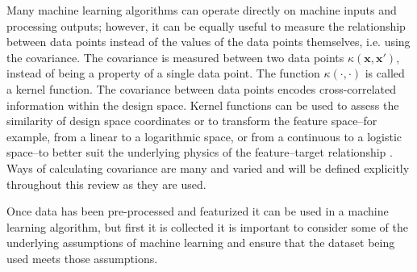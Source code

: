 Many machine learning algorithms can operate directly on machine inputs and processing outputs; however, it can be equally useful to measure the relationship between data points instead of the values of the data points themselves, i.e. using the covariance. The covariance is measured between two data points $\kappa (\mathbf{x},\mathbf{x}')$, instead of being a property of a single data point. The function $\kappa(\cdot,\cdot)$ is called a kernel function. The covariance between data points encodes cross-correlated information within the design space. Kernel functions can be used to assess the similarity of design space coordinates or to transform the feature space--for example, from a linear to a logarithmic space, or from a continuous to a logistic space--to better suit the underlying physics of the feature--target relationship \cite{KernelMethod}. Ways of calculating covariance are many and varied and will be defined explicitly throughout this review as they are used.

Once data has been pre-processed and featurized it can be used in a machine learning algorithm, but first it is collected it is important to consider some of the underlying assumptions of machine learning and ensure that the dataset being used meets those assumptions.